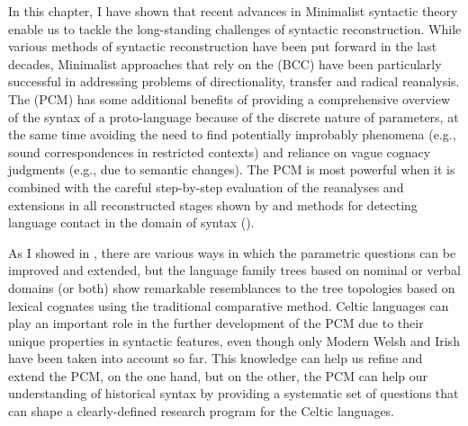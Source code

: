 \documentclass[output=paper,colorlinks,citecolor=brown]{langscibook}
\begin{document}
In this chapter, I have shown that recent advances in Minimalist syntactic theory enable us to tackle the long-standing challenges of syntactic reconstruction. While various methods of syntactic reconstruction have been put forward in the last decades, Minimalist approaches that rely on the  (BCC) have been particularly successful in addressing problems of directionality, transfer and radical reanalysis. The  (PCM) has some additional benefits of providing a comprehensive overview of the syntax of a proto-language because of the discrete nature of parameters, at the same time avoiding the need to find potentially improbably phenomena (e.g., sound correspondences in restricted contexts) and reliance on vague cognacy judgments (e.g., due to semantic changes). The PCM is most powerful when it is combined with the careful step-by-step evaluation of the reanalyses and extensions in all reconstructed stages shown by \citet{mm:willis_reconstructing_2011}  and methods for detecting language contact in the domain of syntax (\citealt{mm:bowern_syntactic_2008, mm:daniels_method_2017}).

As I showed in , there are various ways in which the parametric questions can be improved and extended, but the language family trees based on nominal or verbal domains (or both) show remarkable resemblances to the tree topologies based on lexical cognates using the traditional comparative method. Celtic languages can play an important role in the further development of the PCM due to their unique properties in syntactic features, even though only Modern Welsh and Irish have been taken into account so far. This knowledge can help us refine and extend the PCM, on the one hand, but on the other, the PCM can help our understanding of historical syntax by providing a systematic set of questions that can shape a clearly-defined research program for the Celtic languages.

\printbibliography[heading=subbibliography,notkeyword=this]

\end{document}
